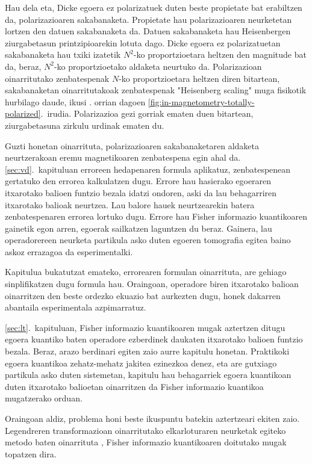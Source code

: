 Hau dela eta, Dicke egoera ez polarizatuek duten beste propietate bat erabiltzen da, polarizazioaren sakabanaketa.
Propietate hau polarizazioaren neurketetan lortzen den datuen sakabanaketa da.
Datuen sakabanaketa hau Heisenbergen ziurgabetasun printzipioarekin lotuta dago.
Dicke egoera ez polarizatuetan sakabanaketa hau txiki izatetik $N^2$-ko proportzioetara heltzen den magnitude bat da, beraz, $N^2$-ko proportzioetako aldaketa neurtuko da.
Polarizazioan oinarritutako zenbatespenak $N$-ko proportzioetara heltzen diren bitartean, sakabanaketan oinarritutakoak zenbatespenak "Heisenberg scaling" muga fisikotik hurbilago daude, ikusi \pageref{fig:in-magnetometry-totally-polarized}. orrian dagoen \ref{fig:in-magnetometry-totally-polarized}.~irudia.
Polarizazioa gezi gorriak ematen duen bitartean, ziurgabetasuna zirkulu urdinak ematen du.

Guzti honetan oinarrituta, polarizazioaren sakabanaketaren aldaketa neurtzerakoan eremu magnetikoaren zenbatespena egin ahal da.
\ref{sec:vd}.~kapituluan erroreen hedapenaren formula aplikatuz, zenbatespenean gertatuko den errorea kalkulatzen dugu.
Errore hau hasierako egoeraren itxarotako balioen funtzio bezala idatzi ondoren, aski da lau behagarriren itxarotako balioak neurtzea.
Lau balore hauek neurtzearekin batera zenbatespenaren errorea lortuko dugu.
Errore hau Fisher informazio kuantikoaren gainetik egon arren, egoerak sailkatzen laguntzen du beraz.
Gainera, lau operadorereen neurketa partikula asko duten egoeren tomografia egitea baino askoz errazagoa da esperimentalki.

Kapitulua bukatutzat emateko, errorearen formulan oinarrituta, are gehiago sinplifikatzen dugu formula hau.
Oraingoan, operadore biren itxarotako balioan oinarritzen den beste ordezko ekuazio bat aurkezten dugu, honek dakarren abantaila esperimentala azpimarratuz.

\ref{sec:lt}.~kapituluan, Fisher informazio kuantikoaren mugak aztertzen ditugu egoera kuantiko baten operadore ezberdinek daukaten itxarotako balioen funtzio bezala.
Beraz, arazo berdinari egiten zaio aurre kapitulu honetan.
Praktikoki egoera kuantikoa zehatz-mehatz jakitea ezinezkoa denez, eta are gutxiago partikula asko duten sistemetan, kapitulu hau behagarriek egoera kuantikoan duten itxarotako balioetan oinarritzen da Fisher informazio kuantikoa mugatzerako orduan.

Oraingoan aldiz, problema honi beste ikuspuntu batekin aztertzeari ekiten zaio.
Legendreren transformazioan oinarritutako elkarloturaren neurketak egiteko metodo baten oinarrituta \cite{Guehne2007}, Fisher informazio kuantikoaren doitutako mugak topatzen dira.


